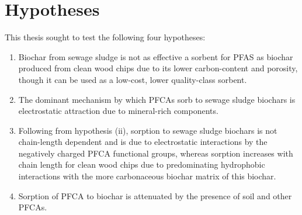 \section{Hypotheses \label{sec:hypothesis}}
This thesis sought to test the following four hypotheses:
\begin{enumerate}[label=\roman*]
    \item Biochar from sewage sludge is not as effective a sorbent for PFAS as biochar produced from clean wood chips due to its lower carbon-content and porosity, though it can be used as a low-cost, lower quality-class sorbent.
    \item The dominant mechanism by which PFCAs sorb to sewage sludge biochars is electrostatic attraction due to mineral-rich components.
    \item Following from hypothesis (ii), sorption to sewage sludge biochars is not chain-length dependent and is due to electrostatic interactions by the negatively charged PFCA functional groups, whereas sorption increases with chain length for clean wood chips due to predominating hydrophobic interactions with the more carbonaceous biochar matrix of this biochar.
    \item Sorption of PFCA to biochar is attenuated by the presence of soil and other PFCAs. 
\end{enumerate} 



